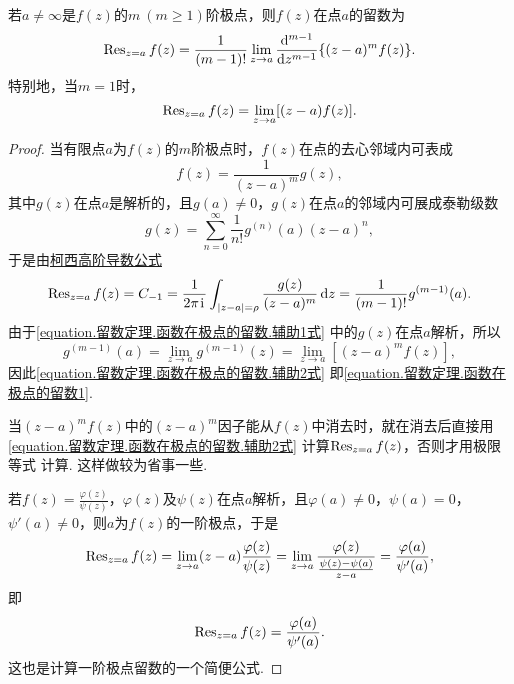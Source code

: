 \begin{property}
若\(a\neq\infty\)是\(f(z)\)的\(m\ (m\geqslant1)\)阶极点，则\(f(z)\)在点\(a\)的留数为\begin{equation}\label{equation.留数定理.函数在极点的留数1}
\operatorname{Res}_{z=a} f(z)
= \frac{1}{(m-1)!} \lim\limits_{z \to a} \dv[m-1]{z} \{ (z-a)^m f(z) \}.
\end{equation}
特别地，当\(m=1\)时，\begin{equation}\label{equation.留数定理.函数在极点的留数2}
\operatorname{Res}_{z=a} f(z)
= \lim\limits_{z \to a} [(z-a) f(z)].
\end{equation}
\begin{proof}
当有限点\(a\)为\(f(z)\)的\(m\)阶极点时，\(f(z)\)在点的去心邻域内可表成\begin{equation}\label{equation.留数定理.函数在极点的留数.辅助1式}
f(z) = \frac{1}{(z-a)^m} g(z),
\end{equation}
其中\(g(z)\)在点\(a\)是解析的，且\(g(a)\neq0\)，\(g(z)\)在点\(a\)的邻域内可展成泰勒级数\[
g(z) = \sum\limits_{n=0}^{\infty} \frac{1}{n!} g^{(n)}(a) (z-a)^n,
\]于是由\hyperref[equation:解析函数的积分表示.柯西高阶导数公式]{柯西高阶导数公式}\begin{equation}\label{equation.留数定理.函数在极点的留数.辅助2式}
\operatorname{Res}_{z=a} f(z) = C_{-1}
= \frac{1}{2\pi\kern1pt\mathrm{i}\kern1pt} \int_{\abs{z-a}=\rho} \frac{g(z)}{(z-a)^m} \dd{z}
= \frac{1}{(m-1)!} g^{(m-1)}(a).
\end{equation}由于\cref{equation.留数定理.函数在极点的留数.辅助1式} 中的\(g(z)\)在点\(a\)解析，所以\[
g^{(m-1)}(a) = \lim\limits_{z \to a} g^{(m-1)}(z)
= \lim\limits_{z \to a} [(z-a)^m f(z)],
\]因此\cref{equation.留数定理.函数在极点的留数.辅助2式} 即\cref{equation.留数定理.函数在极点的留数1}.

当\((z-a)^m f(z)\)中的\((z-a)^m\)因子能从\(f(z)\)中消去时，就在消去后直接用\cref{equation.留数定理.函数在极点的留数.辅助2式} 计算\(\operatorname{Res}_{z=a} f(z)\)，否则才用极限等式  计算.
这样做较为省事一些.

若\(f(z) = \frac{\varphi(z)}{\psi(z)}\)，\(\varphi(z)\)及\(\psi(z)\)在点\(a\)解析，且\(\varphi(a)\neq0\)，\(\psi(a)=0\)，\(\psi'(a)\neq0\)，则\(a\)为\(f(z)\)的一阶极点，于是\[
\operatorname{Res}_{z=a} f(z)
= \lim\limits_{z \to a} (z-a) \frac{\varphi(z)}{\psi(z)}
= \lim\limits_{z \to a} \frac{\varphi(z)}{\frac{\psi(z)-\psi(a)}{z-a}}
= \frac{\varphi(a)}{\psi'(a)},
\]即\begin{equation}\label{equation.留数定理.函数在极点的留数3}
\operatorname{Res}_{z=a} f(z)
= \frac{\varphi(a)}{\psi'(a)}.
\end{equation}
这也是计算一阶极点留数的一个简便公式.
\end{proof}
\end{property}


